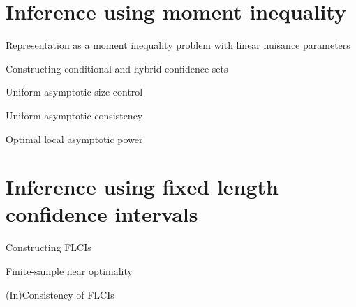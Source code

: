 \documentclass[xcolor=svgnames,aspectratio=169]{beamer}
\begin{document}
\section{Inference using moment inequality}

\begin{frame}{Representation as a moment inequality problem with linear nuisance parameters}
\begin{itemize}
\end{itemize}
\end{frame}

\begin{frame}{Constructing conditional and hybrid confidence sets}
\begin{itemize}
\end{itemize}
\end{frame}

\begin{frame}{Uniform asymptotic size control}
\begin{itemize}
\end{itemize}
\end{frame}

\begin{frame}{Uniform asymptotic consistency}
\begin{itemize}
\end{itemize}
\end{frame}

\begin{frame}{Optimal local asymptotic power}
\begin{itemize}
\end{itemize}
\end{frame}

\section{Inference using fixed length confidence intervals}

\begin{frame}{Constructing FLCIs}
\begin{itemize}
\end{itemize}
\end{frame}

\begin{frame}{Finite-sample near optimality}
\begin{itemize}
\end{itemize}
\end{frame}

\begin{frame}{(In)Consistency of FLCIs}
\begin{itemize}
\end{itemize}
\end{frame}
\end{document}
